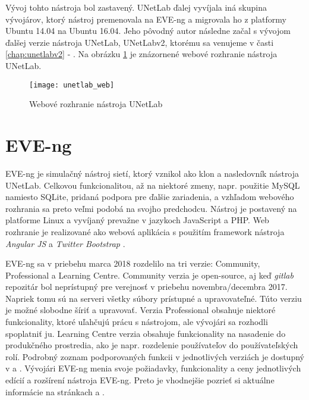 Vývoj tohto nástroja bol zastavený. UNetLab ďalej vyvíjala iná skupina vývojárov, ktorý nástroj premenovala na EVE-ng a migrovala ho z platformy Ubuntu 14.04 na Ubuntu 16.04. Jeho pôvodný autor následne začal s vývojom ďalšej verzie nástroja UNetLab, UNetLabv2, ktorému sa venujeme v časti \ref{chap:unetlabv2} - . Na obrázku \ref{obr:unetlab_web} je znázornené webové rozhranie nástroja UNetLab.

\begin{figure}
    \centering
    \texttt{[image: unetlab\_web]}
    \caption{Webové rozhranie nástroja UNetLab}
    \cite{obr_unetlab_web}
    \label{obr:unetlab_web}
\end{figure}





\section{EVE-ng}
\label{chap:virt_lab_eve_ng}

EVE-ng je simulačný nástroj sietí, ktorý vznikol ako klon a nasledovník nástroja UNetLab. Celkovou funkcionalitou, až na niektoré zmeny, napr. použitie MySQL namiesto SQLite, pridaná podpora pre ďalšie zariadenia, a vzhľadom webového rozhrania sa preto veľmi podobá na svojho predchodcu. Nástroj je postavený na platforme Linux a vyvíjaný prevažne v jazykoch JavaScript a PHP. Web rozhranie je realizované ako webová aplikácia s použitím framework nástroja \emph{Angular JS} a \emph{Twitter Bootstrap} \cite{eve_ng_technologies}.

EVE-ng sa v priebehu marca 2018 rozdelilo na tri verzie: Community, Professional a Learning Centre. Community verzia je open-source, aj keď \emph{gitlab} repozitár bol neprístupný pre verejnosť v priebehu novembra/decembra 2017. Napriek tomu sú na serveri všetky súbory prístupné a upravovateľné. Túto verziu je možné slobodne šíriť a upravovať. Verzia Professional obsahuje niektoré funkcionality, ktoré uľahčujú prácu s nástrojom, ale vývojári sa rozhodli spoplatniť ju. Learning Centre verzia obsahuje funkcionality na nasadenie do produkčného prostredia, ako je napr. rozdelenie používateľov do používateľských rolí. Podrobný zoznam podporovaných funkcii v jednotlivých verziách je dostupný v \cite{eve_ng_versions_table} a \cite{eve_ng_versions_list}. Vývojári EVE-ng menia svoje požiadavky, funkcionality a ceny jednotlivých edícií a rozšírení nástroja EVE-ng. Preto je vhodnejšie pozrieť si aktuálne informácie na stránkach \cite{eve_ng_pro_buy} a \cite{eve_ng_learning_centre_buy}.

